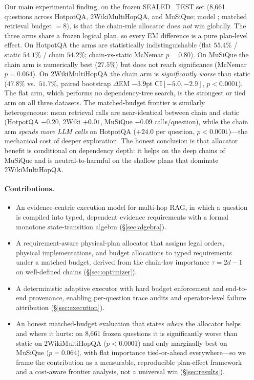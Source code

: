 Our main experimental finding, on the frozen SEALED\_TEST set (8,661 questions
across HotpotQA, 2WikiMultiHopQA, and MuSiQue; model ; matched
retrieval budget $=8$), is that the chain-rule allocator does \emph{not} win
globally. The three arms share a frozen logical plan, so every EM difference is
a pure plan-level effect. On HotpotQA the arms are statistically
indistinguishable (flat $55.4\%$ / static $54.1\%$ / chain $54.2\%$;
chain-vs-static McNemar $p{=}0.80$). On MuSiQue the chain arm is numerically
best ($27.5\%$) but does not reach significance (McNemar $p{=}0.064$). On
2WikiMultiHopQA the chain arm is \emph{significantly worse} than static
($47.8\%$ vs.\ $51.7\%$, paired bootstrap $\Delta$EM $-3.9$pt CI$[-5.0,-2.9]$,
$p<0.0001$). The flat arm, which performs no dependency-tree search, is the
strongest or tied arm on all three datasets. The matched-budget frontier is
similarly heterogeneous: mean retrieval calls are near-identical between chain
and static (HotpotQA $-0.20$, 2Wiki $+0.01$, MuSiQue $-0.09$ calls/question),
while the chain arm \emph{spends more LLM calls} on HotpotQA ($+24.0$ per
question, $p<0.0001$)---the mechanical cost of deeper exploration. The honest
conclusion is that allocator benefit is conditional on dependency depth: it
helps on the deep chains of MuSiQue and is neutral-to-harmful on the shallow
plans that dominate 2WikiMultiHopQA.

\paragraph{Contributions.}
\begin{itemize}
\item An evidence-centric execution model for multi-hop RAG, in which a
question is compiled into typed, dependent evidence requirements with a formal
monotone state-transition algebra (\S\ref{sec:algebra}).
\item A requirement-aware physical-plan allocator that assigns legal orders,
physical implementations, and budget allocations to typed requirements under a
matched budget, derived from the chain-law importance
$\tau = 2d-1$ on well-defined chains (\S\ref{sec:optimizer}).
\item A deterministic adaptive executor with hard budget enforcement and
end-to-end provenance, enabling per-question trace audits and operator-level
failure attribution (\S\ref{sec:execution}).
\item An honest matched-budget evaluation that states \emph{where} the
allocator helps and where it hurts: on 8,661 frozen questions it is
significantly worse than static on 2WikiMultiHopQA ($p<0.0001$) and only
marginally best on MuSiQue ($p{=}0.064$), with flat importance tied-or-ahead
everywhere---so we frame the contribution as a measurable, reproducible
plan-effect framework and a cost-aware frontier analysis, not a universal
win (\S\ref{sec:results}).
\end{itemize}
